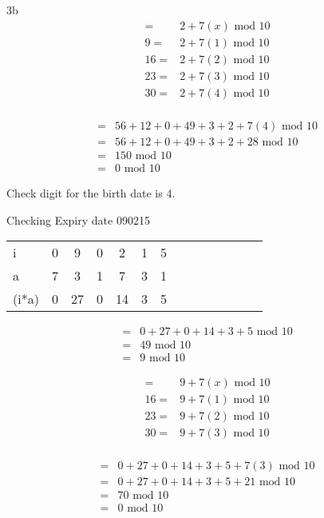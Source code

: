 \begin{question}{3b}
\begin{align*}
=& 2 + 7(x)\textrm{ mod } 10\\
9=& 2 + 7(1)\textrm{ mod } 10\\
16=& 2 + 7(2)\textrm{ mod } 10\\
23=& 2 + 7(3)\textrm{ mod } 10\\
30=& 2 + 7(4)\textrm{ mod } 10\\
\end{align*}

\begin{align*}
=& 56 + 12 + 0 + 49 + 3 + 2 + 7(4)\textrm{ mod } 10\\
=& 56 + 12 + 0 + 49 + 3 + 2 + 28\textrm{ mod } 10\\
=& 150 \textrm{ mod } 10\\
=& 0 \textrm{ mod } 10
\end{align*}

Check digit for the birth date is 4.



Checking Expiry date
090215

\begin{tabular}{l|ccccccccccccc}
\hline
i     & 0  & 9  & 0  & 2  & 1  & 5  \\
a     & 7  & 3  & 1  & 7  & 3  & 1  \\
\hline
(i*a) & 0  & 27 & 0  & 14 & 3  & 5
\end{tabular}

\begin{align*}
=& 0  + 27 + 0  + 14 + 3  + 5  \textrm{ mod } 10\\
=& 49 \textrm{ mod } 10\\
=& 9 \textrm{ mod } 10
\end{align*}

\begin{align*}
=& 9 + 7(x)\textrm{ mod } 10\\
16=& 9 + 7(1)\textrm{ mod } 10\\
23=& 9 + 7(2)\textrm{ mod } 10\\
30=& 9 + 7(3)\textrm{ mod } 10\\
\end{align*}

\begin{align*}
=& 0  + 27 + 0  + 14 + 3  + 5 +7(3) \textrm{ mod } 10\\
=& 0  + 27 + 0  + 14 + 3  + 5 + 21 \textrm{ mod } 10\\
=& 70 \textrm{ mod } 10\\
=& 0 \textrm{ mod } 10
\end{align*}


\end{question}
